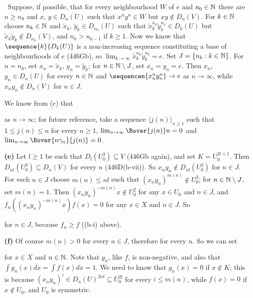 {\Quer\ Suppose, if possible, that for every neighbourhood $W$ of $e$ and
$n_0\in\Bbb N$ there are $n\ge n_0$ and $x$, $y\in D_n(U)$ such that
$x^ny^n\in W$ but $xy\notin D_n(V)$.   For $k\in\Bbb N$ choose
$n_k\in\Bbb N$ and $\tilde x_k$, $\tilde y_k\in D_{n_k}(U)$ such that
$\tilde x_k^{n_k}\tilde y_k^{n_k}\in D_k(U)$ but
$\tilde x_k\tilde y_k\notin D_{n_k}(V)$, and $n_k>n_{k-1}$ if $k\ge 1$.
Now we know that
$\sequence{k}{D_k(U)}$ is a non-increasing sequence constituting a base
of neighbourhoods of $e$ (446Gb), so
$\lim_{k\to\infty}\tilde x_k^{n_k}\tilde y_k^{n_k}=e$.    Set
$J=\{n_k:k\in\Bbb N\}$.   For
$n=n_k$, set $x_n=\tilde x_k$, $y_n=\tilde y_k$;  for
$n\in\Bbb N\setminus J$, set $x_n=y_n=e$.
Then $x_n$, $y_n\in D_n(U)$ for every
$n\in\Bbb N$ and $\sequencen{x_n^ny_n^n}\to e$ as $n\to\infty$, while
$x_ny_n\notin D_n(V)$ for $n\in J$.

We know from (c) that


\noindent as $n\to\infty$;  for future reference, take a sequence
$\langle j(n)\rangle_{n\ge 1}$ such that $1\le j(n)\le n$ for every
$n\ge 1$, $\lim_{n\to\infty}\Bover{j(n)}n=0$ and
$\lim_{n\to\infty}\Bover{n\gamma_n}{j(n)}=0$.

\medskip

{\bf (e)} Let $l\ge 1$ be such that $D_l(U_0^3)\subseteq V$ (446Gb
again), and set
$K=U_0^{2l+1}$.   Then $D_{nl}(U_0^3)\subseteq D_n(V)$
for every $n$ (446D(b-vii)).   So $x_ny_n\notin D_{nl}(U_0^3)$ for
$n\in J$.   For each $n\in J$ choose $m(n)\le nl$ such that
$(x_ny_n)^{m(n)}\notin U_0^3$;  for $n\in\Bbb N\setminus J$, set
$m(n)=1$.
Then $(x_ny_n)^{-m(n)}x\notin U_0^2$ for any $x\in U_0$ and $n\in J$, and
$f_n((x_ny_n)^{-m(n)}x)f(x)=0$ for any $x\in X$ and $n\in J$.   So


\noindent for $n\in J$, because $f_n\ge f$ ((b-i) above).

\medskip

{\bf (f)} Of course $m(n)>0$ for every $n\in J$, therefore for every
$n$.   So we can set


\noindent for $x\in X$ and $n\in\Bbb N$.   Note that $g_n$, like $f$, is
non-negative, and also that $\int g_n(x)dx=\int f(x)dx=1$.   We need to
know that $g_n(x)=0$ if $x\notin K$;  this is because
$(x_ny_n)^i\in D_n(U)^{2nl}\subseteq U_0^{2l}$ for every $i\le m(n)$,
while $f(x)=0$ if
$x\notin U_0$, and $U_0$ is symmetric.

}
